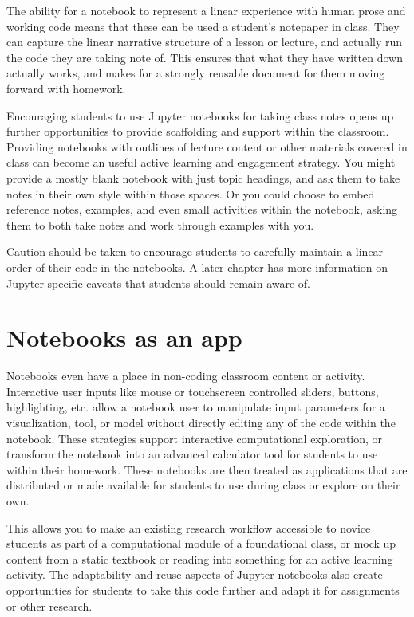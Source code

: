 \documentclass[]{book}
\begin{document}
The ability for a notebook to represent a linear experience with human
prose and working code means that these can be used a student's
notepaper in class. They can capture the linear narrative structure of a
lesson or lecture, and actually run the code they are taking note of.
This ensures that what they have written down actually works, and makes
for a strongly reusable document for them moving forward with homework.

Encouraging students to use Jupyter notebooks for taking class notes
opens up further opportunities to provide scaffolding and support within
the classroom. Providing notebooks with outlines of lecture content or
other materials covered in class can become an useful active learning
and engagement strategy. You might provide a mostly blank notebook with
just topic headings, and ask them to take notes in their own style
within those spaces. Or you could choose to embed reference notes,
examples, and even small activities within the notebook, asking them to
both take notes and work through examples with you.

Caution should be taken to encourage students to carefully maintain a
linear order of their code in the notebooks. A later chapter has more
information on Jupyter specific caveats that students should remain
aware of.

\section{Notebooks as an app}\label{notebooks-as-an-app}

Notebooks even have a place in non-coding classroom content or activity.
Interactive user inputs like mouse or touchscreen controlled sliders,
buttons, highlighting, etc. allow a notebook user to manipulate input
parameters for a visualization, tool, or model without directly editing
any of the code within the notebook. These strategies support
interactive computational exploration, or transform the notebook into an
advanced calculator tool for students to use within their homework.
These notebooks are then treated as applications that are distributed or
made available for students to use during class or explore on their own.

This allows you to make an existing research workflow accessible to
novice students as part of a computational module of a foundational
class, or mock up content from a static textbook or reading into
something for an active learning activity. The adaptability and reuse
aspects of Jupyter notebooks also create opportunities for students to
take this code further and adapt it for assignments or other research.
\end{document}

